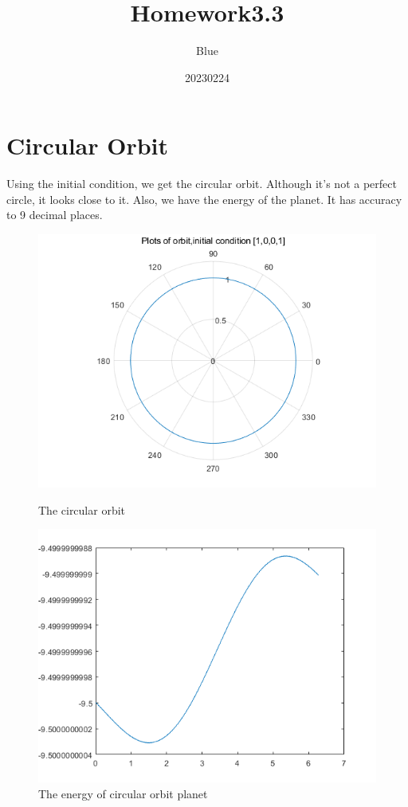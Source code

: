\documentclass{article}
\title{Homework3.3}
\author{Blue}
\date{20230224}
\begin{document}
\maketitle
\section{Circular Orbit}

Using the initial condition, we get the circular orbit. Although it's not a perfect circle, it looks close to it. Also, we have the energy of the planet. It has accuracy to 9 decimal places.
\begin{figure}[htbp]
    \centering
    \begin{minipage}{0.45\linewidth}
        \centering
        \includegraphics[width=\linewidth]{ar1.png}
        \caption{The circular orbit}
        \label{fig:picture1}
    \end{minipage}
    \hfill
    \begin{minipage}{0.45\linewidth}
        \centering
        \includegraphics[width=\linewidth]{ar11.png}
        \caption{The energy of circular orbit planet}
        \label{fig:picture2}
    \end{minipage}
\end{figure}
\end{document}
